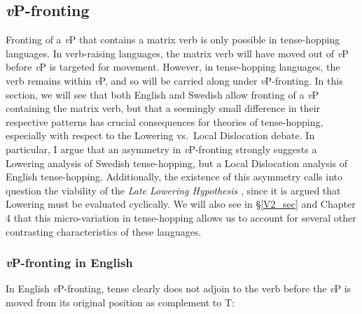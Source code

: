 \subsection{\textit{v}P-fronting} \label{vp-front_sec}
Fronting of a {\it v}P that contains a matrix verb is only possible in tense-hopping languages. In verb-raising languages, the matrix verb will have moved out of {\it v}P before {\it v}P is targeted for movement. However, in tense-hopping languages, the verb remains within {\it v}P, and so will be carried along under {\it v}P-fronting. In this section, we will see that both English and Swedish allow fronting of a {\it v}P containing the matrix verb, but that a seemingly small difference in their respective patterns has crucial consequences for theories of tense-hopping, especially with respect to the Lowering vs.\ Local Dislocation debate. In particular, I argue that an asymmetry in {\it v}P-fronting strongly suggests a Lowering analysis of Swedish tense-hopping, but a Local Dislocation analysis of English tense-hopping. Additionally, the existence of this asymmetry calls into question the viability of the {\it Late Lowering Hypothesis} \citep{embick_noyer2001}, since it is argued that Lowering must be evaluated cyclically. We will also see in \S\ref{V2_sec} and Chapter 4 that this micro-variation in tense-hopping allows us to account for several other contrasting characteristics of these languages.\\

\noindent
\subsubsection{\textit{v}P-fronting in English}

\noindent
In English \textit{v}P-fronting, tense clearly does not adjoin to the verb before the \textit{v}P is moved from its original position as complement to T:

